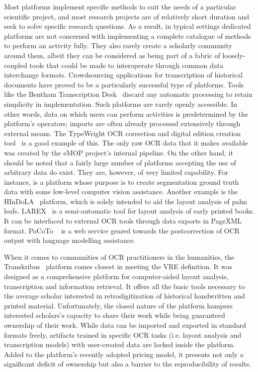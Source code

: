 Most platforms implement specific methods to suit the needs of a particular
scientific project, and most research projects are of relatively short duration
and seek to solve specific research questions. As a result, in typical settings
dedicated platforms are not concerned with implementing a complete catalogue of
methods to perform an activity fully. They also rarely create a scholarly
community around them, albeit they can be considered as being part of a fabric
of loosely-coupled tools that could be made to interoperate through common data
interchange formats. Crowdsourcing applications for transcription of historical
documents have proved to be a particularly successful type of platforms. Tools
like the Bentham Transcription Desk~\cite{moyle2011manuscript} discard any
automatic processing to retain simplicity in implementation. Such platforms are
rarely openly accessible. In other words, data on which users can perform
activities is predetermined by the platform’s operators; imports are often
already processed extensively through external means. The TypeWright OCR
correction and digital edition creation tool~\cite{typewright} is a good example
of this. The only raw OCR data that it makes available was created by the eMOP
project's internal pipeline. On the other hand, it should be noted that a
fairly large number of platforms accepting the use of arbitrary data do exist.
They are, however, of very limited capability. For instance, \cite{webaletheia}
is a platform whose purpose is to create segmentation ground truth data with
some low-level computer vision assistance. Another example is the
HInDoLA~\cite{trivedi2019hindola} platform, which is solely intended to aid the
layout analysis of palm leafs. LAREX~\cite{reul2017larex} is a semi-automatic
tool for layout analysis of early printed books. It can be interfaced to
external OCR tools through data exports in PageXML format. PoCoTo
~\cite{vobl2014pocoto} is a web service geared towards the postcorrection of OCR
output with language modelling assistance.

When it comes to communities of OCR practitioners in the humanities, the
Transkribus~\cite{kahle2017transkribus} platform comes closest in meeting the
VRE definition. It was designed as a comprehensive platform for computer-aided
layout analysis, transcription and information retrieval. It offers all the
basic tools necessary to the average scholar interested in retrodigitization of
historical handwritten and printed material. Unfortunately, the closed nature
of the platform hampers interested scholars’s capacity to share their work
while being guaranteed ownership of their work. While data can be imported and
exported in standard formats freely, artifacts trained in specific OCR tasks
(i.e. layout analysis and transcription models) with user-created data are
locked inside the platform. Added to the platform’s recently adopted pricing
model, it presents not only a significant deficit of ownership but also a
barrier to the reproducibility of results.

